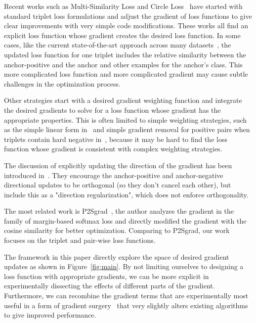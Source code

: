 \documentclass[10pt,twocolumn,letterpaper]{article}
\begin{document}
Recent works such as Multi-Similarity Loss and Circle Loss~\cite{wang2019multi,Sun_2020_CVPR,Xuan_2020_ECCV} have started with standard triplet loss formulations and adjust the gradient of loss functions to give clear improvements with very simple code modifications.  These works all find an explicit loss function whose gradient creates the desired loss function.  In some cases, like the current state-of-the-art approach across many datasets~\cite{wang2019multi}, the updated loss function for one triplet includes the relative similarity between the anchor-positive and the anchor and other examples for the anchor's class.  This more complicated loss function and more complicated gradient may cause subtle challenges in the optimization process.

Other strategies start with a desired gradient weighting function and integrate the desired gradients to solve for a loss function whose gradient has the appropriate properties.  This is often limited to simple weighting strategies, such as the simple linear form in~\cite{Sun_2020_CVPR} and simple gradient removal for positive pairs when triplets contain hard negative in~\cite{Xuan_2020_ECCV}, because it may be hard to find the loss function whose gradient is consistent with complex weighting strategies.

The discussion of explicitly updating the direction of the gradient has been introduced in~\cite{Mohan_2020_CVPR}.  They encourage the anchor-positive and anchor-negative directional updates to be orthogonal (so they don't cancel each other), but include this as a  "direction regularization", which does not enforce orthogonality.

The most related work is P2Sgrad~\cite{zhang2019p2sgrad}, the author analyzes the gradient in the family of margin-based softmax loss and directly modified the gradient with the cosine similarity for better optimization. Comparing to P2Sgrad, our work focuses on the triplet and pair-wise loss functions.

The framework in this paper directly explore the space of desired gradient updates as shown in Figure~\ref{fig:main}.  By not limiting ourselves to designing a loss function with appropriate gradients, we can be more explicit in experimentally dissecting the effects of different parts of the gradient.  Furthermore, we can recombine the gradient terms that are experimentally most useful in a form of gradient surgery~\cite{yu2020gradient} that very slightly alters existing algorithms to give improved performance.
\end{document}
